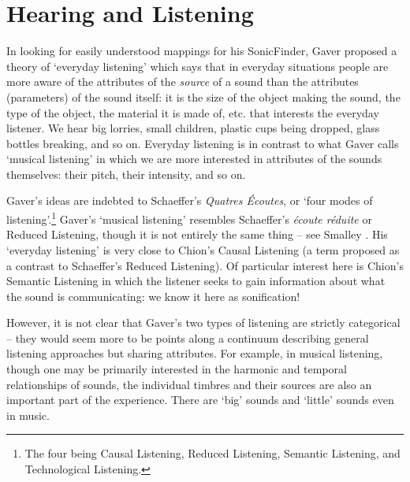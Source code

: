 \documentclass{article}
\begin{document}
\section{Hearing and Listening}
In looking for easily understood mappings for his {\sc SonicFinder}, Gaver \cite{Gaver:1989} proposed a theory of `everyday listening' which says that in everyday situations people are more aware of the attributes of the \textit{source} of a sound than the attributes (parameters) of the sound itself: it is the size of the object making the sound, the type of the object, the material it is made of, etc. that interests the everyday listener. We hear big lorries, small children, plastic cups being dropped, glass bottles breaking, and so on. Everyday listening is in contrast to what Gaver calls `musical listening' in which we are more interested in attributes of the sounds themselves: their pitch, their intensity, and so on.  

Gaver's ideas are indebted to Schaeffer's \textit{Quatres Écoutes}, or `four modes of listening'.\footnote{The four being Causal Listening, Reduced Listening, Semantic Listening, and Technological Listening.} Gaver's `musical listening' resembles Schaeffer's \textit{écoute réduite} or Reduced Listening, though it is not entirely the same thing -- see Smalley \cite[p. 63]{Smalley:1986}. His `everyday listening' is very close to Chion's Causal Listening \cite{Chion:1994} (a term proposed as a contrast to Schaeffer's Reduced Listening). Of particular interest here is Chion's Semantic Listening in which the listener seeks to gain information about what the sound is communicating: we know it here as sonification!

However, it is not clear that Gaver's two types of listening are strictly categorical -- they would seem more to be points along a continuum describing general listening approaches but sharing attributes. For example, in musical listening, though one may be primarily interested in the harmonic and temporal relationships of sounds, the individual timbres and their sources are also an important part of the experience. There are `big' sounds and `little' sounds even in music.
\end{document}
